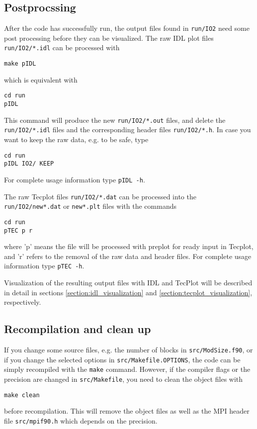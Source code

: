 \subsection{Postprocssing}

After the code has successfully run, the output files 
found in {\tt run/IO2} need some post processing before 
they can be visualized. The raw IDL plot files {\tt run/IO2/*.idl}
can be processed with
\begin{verbatim}
make pIDL
\end{verbatim}
which is equivalent with
\begin{verbatim}
cd run
pIDL
\end{verbatim}
This command will produce the new {\tt run/IO2/*.out}
files, and delete the {\tt run/IO2/*.idl} files
and the corresponding header files {\tt run/IO2/*.h}.
In case you want to keep the raw data, e.g. to be safe, type
\begin{verbatim}
cd run
pIDL IO2/ KEEP
\end{verbatim}
For complete usage information type {\tt pIDL -h}.

The raw Tecplot files {\tt run/IO2/*.dat} can be processed
into the {\tt run/IO2/new*.dat} or {\tt new*.plt} files
with the commands
\begin{verbatim}
cd run
pTEC p r
\end{verbatim}
where 'p' means the file will be processed with preplot for ready input
in Tecplot, and 'r' refers to the removal of the raw data and header
files.  For complete usage information type {\tt pTEC -h}.

Visualization of the resulting output files with IDL and TecPlot
will be described in detail in sections \ref{section:idl_visualization}
and \ref{section:tecplot_visualization}, respectively.

\subsection{Recompilation and clean up}

If you change some source files, e.g. the number of blocks
in {\tt src/ModSize.f90}, or if you change the selected options in
{\tt src/Makefile.OPTIONS}, the code can be simply recompiled
with the {\tt make} command. However, if the compiler flags or the
precision are changed in {\tt src/Makefile}, you need to clean the
object files with
\begin{verbatim}
make clean
\end{verbatim}
before recompilation. This will remove the object files as
well as the MPI header file {\tt src/mpif90.h} which depends
on the precision. 

